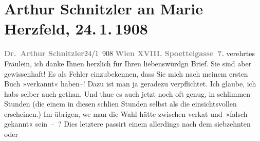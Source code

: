 

         
         \renewcommand{\erwaehntePersonen}{Personen: Herman Bang, Marie Herzfeld}
         \renewcommand{\erwaehnteInstitutionen}{Institutionen: Eugen Diederichs Verlag}
         \renewcommand{\erwaehnteOrte}{Orte: Edmund-Weiß-Gasse, Jena, Wien}
         \renewcommand{\erwaehnteWerke}{Werke: Die Frau des Weisen. Novelletten, Hermann Bang. Eine Silhouette, Leonardo da Vinci. Der Denker, Forscher und Poet. Nach den veröffentlichten Handschriften, Neue Freie Presse}
               \section[Arthur Schnitzler an Marie Herzfeld, 24. 1. 1908]{ Arthur Schnitzler an Marie Herzfeld, 24. 1. 1908}\nopagebreak{}\rehead{ }\begin{ledgroupsized}[t]{13cm}\normalsize\beginnumbering \toendnotes[C]{\smallbreak\pagebreak[2]} 
\toendnotes[C]{\smallbreak}\pstart
           {\pb}\textcolor{gray}{\textbf{Dr. Arthur Schnitzler}}\hfill 24/1 908\pend
           \pstart
           \textcolor{gray}{\textbf{Wien XVIII. Spoettelgasse 7.}}\pend
           \pstart{}verehrtes Fräulein,\pend\pstart
           ich danke Ihnen herzlich für Ihren liebenswürdgn Brief. Sie sind aber gewissenhaft!
               Es als Fehler einzubekennen, dass Sie mich nach meinem ersten Buch »verkannt« haben–!
               Dazu ist man ja geradezu verpflichtet. Ich glaube, ich habs selber auch gethan. Und
               thue es auch jetzt noch oft genug, in schlimmen Stunden (die einem in diesen schli{\geminationm}en Stunden selbst als die einsichtsvollen erscheinen.)
               Im übrigen, we{\geminationn} man die Wahl hätte zwischen verka{\geminationn}t und {\pb}»falsch
               gekannt« sein – ? Dies letztere passirt einem allerdings nach dem siebzehnten oder

\end{ledgroupsized}
